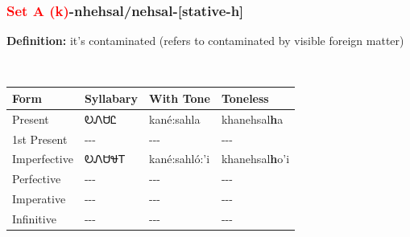 \subsubsection*{\textcolor{Red}{Set A (k)}{-}\textbf{nhehsal/nehsal}{-}[stative-h]}
\nopagebreak
\textbf{Definition: } it{\textquoteright}s contaminated (refers to contaminated by visible foreign matter)
\\[0.5em]
\begin{tabularx}{\textwidth}{l X X X}%
\toprule%
\textbf{Form}&\textbf{Syllabary}&\textbf{With Tone}&\textbf{Toneless}\\%
\midrule%
Present&ᎧᏁᏌᏝ&kané:sahla&khanehsal\textbf{h}a\\%
1st Present&{-}{-}{-}&{-}{-}{-}&{-}{-}{-}\\%
Imperfective&ᎧᏁᏌᏠᎢ&kané:sahló:’i&khanehsal\textbf{h}o'i\\%
Perfective&{-}{-}{-}&{-}{-}{-}&{-}{-}{-}\\%
Imperative&{-}{-}{-}&{-}{-}{-}&{-}{-}{-}\\%
Infinitive&{-}{-}{-}&{-}{-}{-}&{-}{-}{-}\\%
\bottomrule%
\end{tabularx}
\\[1em]